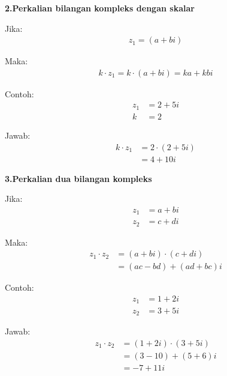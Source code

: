 \documentclass{article}
\begin{document}
\textbf{2.\>Perkalian bilangan kompleks dengan skalar\\}

Jika:
\begin{align}
    z_1 = (a + bi) \nonumber
\end{align}

Maka:
\begin{align}
    k \cdot z_1 = k \cdot (a + bi) = ka + kbi \nonumber
\end{align}

Contoh:
\begin{align}
    z_1 & = 2 + 5i
    \nonumber      \\
    k   & = 2
    \nonumber
\end{align}

Jawab:
\begin{align}
    k \cdot z_1 & = 2 \cdot (2 + 5i)
    \nonumber                        \\
                & = 4 + 10i
    \nonumber
\end{align}
\leavevmode
\newpage

\textbf{3.\>Perkalian dua bilangan kompleks\\}

Jika:
\begin{align}
    z_1 & = a + bi
    \nonumber      \\
    z_2 & = c + di
    \nonumber
\end{align}

Maka:
\begin{align}
    z_1 \cdot z_2 & = (a + bi)\cdot(c + di)
    \nonumber                                \\
                  & = (ac - bd) + (ad + bc)i
    \nonumber
\end{align}

Contoh:
\begin{align}
    z_1 & = 1 + 2i
    \nonumber      \\
    z_2 & = 3 + 5i
    \nonumber
\end{align}

Jawab:
\begin{align}
    z_1 \cdot z_2 & = (1 + 2i) \cdot (3 + 5i)
    \nonumber                                 \\
                  & = (3 - 10) + (5 + 6)i
    \nonumber                                 \\
                  & = -7 + 11i
    \nonumber
\end{align}
\end{document}
